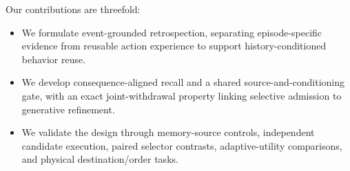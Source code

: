 Our contributions are threefold:
\begin{itemize}
\item We formulate event-grounded retrospection, separating episode-specific evidence from reusable action experience to support history-conditioned behavior reuse.
\item We develop consequence-aligned recall and a shared source-and-conditioning gate, with an exact joint-withdrawal property linking selective admission to generative refinement.
\item We validate the design through memory-source controls, independent candidate execution, paired selector contrasts, adaptive-utility comparisons, and physical destination/order tasks.
\end{itemize}
